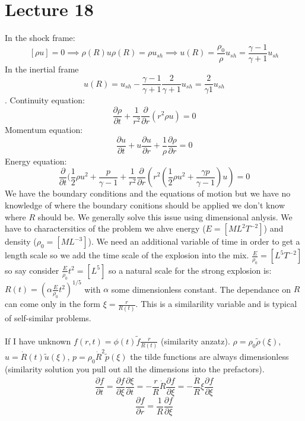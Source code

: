 \documentclass{article}
\begin{document}
        \section{Lecture 18}
        In the shock frame:
        $$
        [\rho u] = 0 \implies \rho(R) u \rho(R) = \rho u_{sh} \implies u(R) = \frac{\rho_0}{\rho} u_{sh} = \frac{\gamma-1}{\gamma +1} u_{sh}
        $$
        In the inertial frame $$u(R) = u_{sh}-\frac{\gamma -1}{\gamma +1} \frac{2}{\gamma +1} u_{sh} = \frac{2}{\gamma 1} u_{sh}$$. 
        Continuity equation:
        $$
        \frac{\partial \rho}{\partial t} + \frac{1}{r^2} \frac{\partial }{\partial r} (r^2 \rho u) = 0
        $$
        Momentum equation:
        $$
        \frac{\partial u}{\partial t} + u \frac{\partial u}{\partial r} + \frac{1}{\rho} \frac{\partial \rho}{\partial r} = 0 
        $$
        Energy equation:
        $$
        \frac{\partial }{\partial t} (\frac{1}{2} \rho u^2 + \frac{p}{\gamma -1} + \frac{1}{r^2}\frac{\partial}{\partial r}(r^2( \frac{1}{2} \rho u^2 + \frac{\gamma p}{\gamma -1})u) = 0
        $$
        We have the boundary conditions and the equations of motion but we have no knowledge of where the boundary conitions should be applied we don't know where $R$ should be. We generally solve this issue using dimensional anlysis. We have to charactersitics of the problem we ahve energy ($E =[ML^2 T^{-2}]$) and density ($ \rho_0 = [ML^{-3}]$). We need an additional variable of time in order to get a length scale so we add the time scale of the explosion into the mix. $\frac{E}{\rho_0} = [L^5 T^{-2}]$ so say consider $\frac{E}{\rho_0}t^2 = [L^5]$ so a natural scale for the strong explosion is: $R(t) = (\alpha \frac{E}{\rho_0}t^2)^{1/5}$ with $\alpha$ some dimensionless constant. The dependance on $R$ can come only in the form $\xi = \frac{r}{R(t)}$. This is a similarility variable and is typical of self-similar problems. \\\\
        If I have unknown $f(r,t) = \phi(t) \tilde f \frac{r}{R(t)}$ (similarity anzatz). $\rho = \rho_0 \tilde \rho(\xi)$, $u= \dot R(t) \tilde u(\xi)$, $p=\rho_0 \dot R^2 \tilde p(\xi)$ the tilde functions are always dimensionless (similarity solution you pull out all the dimensions into the prefactors).
        $$
        \frac{\partial f}{\partial t} = \frac{\partial f}{\partial \xi}\frac{\partial \xi}{\partial t} = - \frac{r}{R} \dot R \frac{\partial f}{\partial \xi} = - \frac{\dot R}{R} \xi \frac{\partial f}{\partial \xi}
        $$
        $$
        \frac{\partial f}{\partial r} = \frac{1}{R} \frac{\partial f}{\partial \xi}
        $$
\end{document}
